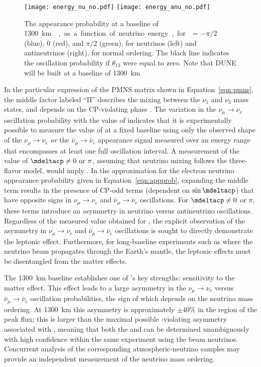 \begin{figure}
  \centering
\texttt{[image: energy\_nu\_no.pdf]}
\texttt{[image: energy\_anu\_no.pdf]}
  \caption[Appearance probabilities for \nue and \anue at \SI{1300}{\km}]{The appearance probability at a baseline of \SI{1300}\km{},
  as a function of neutrino energy, for \deltacp = $-\pi/2$ (blue), 
  0 (red), and $\pi/2$ (green), for neutrinos (left) and antineutrinos
  (right), for normal ordering. The black line indicates the oscillation
  probability if $\theta_{13}$ were equal to zero. Note that DUNE will be built at a baseline of \SI{1300}{\km}}
  \label{fig:oscprob}
\end{figure}

In the particular expression of the PMNS matrix shown in
Equation~\ref{eqn:pmns}, the middle factor labeled ``II'' describes
the mixing between the $\nu_1$ and $\nu_3$ mass states, and depends on
the CP-violating phase \deltacp. The variation in the $\nu_\mu \rightarrow
\nu_e$ oscillation probability with the value of \deltacp
indicates that it is experimentally possible to measure the value of
\deltacp at a fixed baseline using only the observed shape of the
$\nu_\mu \rightarrow \nu_e$ {\em or} the 
$\bar{\nu}_\mu \rightarrow \bar{\nu}_e$
appearance signal measured over an energy range that encompasses at
least one full oscillation interval. A measurement of the value of
$\mdeltacp \neq 0 \ {\rm or} \ \pi$, assuming that neutrino mixing follows the three-flavor model, would imply . In the approximation for the electron neutrino appearance
probability given in Equation~\ref{eqn:appprob}, expanding the middle
term results in the presence of CP-odd terms (dependent on $\sin
\mdeltacp$) that have opposite signs in $\nu_{\mu} \rightarrow \nu_e$
and $\bar{\nu}_{\mu} \rightarrow \bar{\nu}_e$ oscillations.
For $\mdeltacp \neq 0$ or $\pi$, these terms introduce an asymmetry in
neutrino versus antineutrino oscillations. 
Regardless of the measured value obtained for \deltacp, the explicit
observation of the asymmetry in $\nu_{\mu}
\rightarrow \nu_e$ and $\bar{\nu}_{\mu} \rightarrow
\bar{\nu}_e$ oscillations is sought to directly demonstrate the
leptonic  effect.  
Furthermore, for long-baseline
experiments such as  where the neutrino beam propagates through
the Earth's mantle, the leptonic  effects must be
disentangled from the matter effects.

The \SI{1300}{\km} baseline establishes one of 's key strengths: sensitivity to the matter effect. This effect leads to a large asymmetry in the $\nu_\mu\to \nu_e$ versus $\bar{\nu}_\mu \to \bar{\nu}_e$ oscillation probabilities, the sign of which depends on the neutrino mass ordering.  At \SI{1300}{\km} this asymmetry is approximately $\pm 40\%$ in the region of the peak flux; this is larger than the maximal possible -violating asymmetry associated with \deltacp, meaning that both the  and \deltacp can be determined
unambiguously with high confidence within the same experiment using the beam neutrinos. Concurrent analysis of the corresponding atmospheric-neutrino samples may provide an independent measurement of the neutrino mass ordering.


